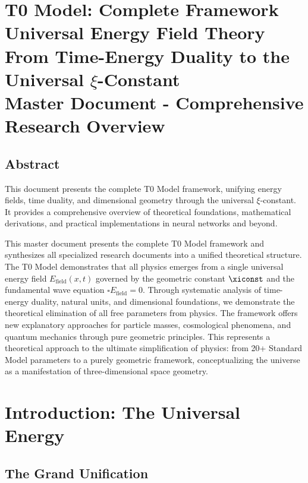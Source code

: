\chapter{ T0 Model: Complete Framework \\[0.3cm]
	 Universal Energy Field Theory \\[0.3cm]
	 From Time-Energy Duality to the Universal $\xi$-Constant \\[0.5cm]
	 Master Document - Comprehensive Research Overview}

\section*{Abstract}
	This document presents the complete T0 Model framework, unifying energy fields, time duality, and dimensional geometry through the universal $\xi$-constant. It provides a comprehensive overview of theoretical foundations, mathematical derivations, and practical implementations in neural networks and beyond.

		This master document presents the complete T0 Model framework and synthesizes all specialized research documents into a unified theoretical structure. The T0 Model demonstrates that all physics emerges from a single universal energy field $E_{\text{field}}(x,t)$ governed by the geometric constant $\xiconst$ and the fundamental wave equation $\square E_{\text{field}} = 0$. Through systematic analysis of time-energy duality, natural units, and dimensional foundations, we demonstrate the theoretical elimination of all free parameters from physics. The framework offers new explanatory approaches for particle masses, cosmological phenomena, and quantum mechanics through pure geometric principles. This represents a theoretical approach to the ultimate simplification of physics: from 20+ Standard Model parameters to a purely geometric framework, conceptualizing the universe as a manifestation of three-dimensional space geometry.

	
	\listoftables
	
	\chapter{Introduction: The Universal Energy}
	
	\section{The Grand Unification}
	
